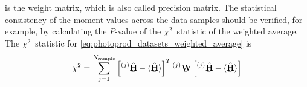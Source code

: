 is the weight matrix, which is also called precision matrix.  The
statistical consistency of the moment values across the data samples
should be verified, for example, by calculating the $P$-value of the
$\chi^2$~statistic of the weighted average.  The $\chi^2$~statistic
for \cref{eq:photoprod_datasets_weighted_average} is
\begin{equation}
  \chi^2
  = \sum_{j = 1}^{N_\text{sample}}
  \sBrk[2]{\prescript{(j)}{}{\vphantom{\vect{H}}}\underaccent{\bar}{\hat{\vect{H}}} - \mean{\underaccent{\bar}{\hat{\vect{H}}}}}^T
  \prescript{(j)}{}{\underaccent{\bar}{\mat{W}}}
  \sBrk[2]{\prescript{(j)}{}{\vphantom{\vect{H}}}\underaccent{\bar}{\hat{\vect{H}}} - \mean{\underaccent{\bar}{\hat{\vect{H}}}}}
\end{equation}



